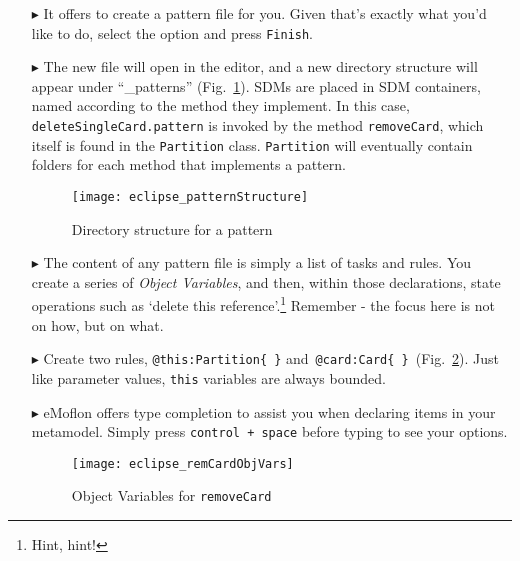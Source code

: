 \begin{itemize}
\item[$\blacktriangleright$] It offers to create a pattern file for you. Given that's exactly what you'd like to do, select the option and press
\texttt{Finish}.

\item[$\blacktriangleright$] The new file will open in the editor, and a new directory structure will appear under ``\_patterns'' (Fig.~\ref{fig:pattStruct}). SDMs are
placed in SDM containers, named according to the method they implement. In this case, \texttt{deleteSingleCard.pattern} is invoked by the method \texttt{removeCard},
which itself is found in the \texttt{Partition} class. \texttt{Partition} will eventually contain folders for each method that implements a pattern.

\begin{figure}[htp]
\begin{center}
  \texttt{[image: eclipse\_patternStructure]}
  \caption{Directory structure for a pattern}
  \label{fig:pattStruct}
\end{center}
\end{figure}

\item[$\blacktriangleright$] The content of any pattern file is simply a list of tasks and rules. You create a series of \emph{Object Variables}, and then,
within those declarations, state operations such as `delete this reference'.\footnote{Hint, hint!} Remember - the focus here is not on how, but on what.

\item[$\blacktriangleright$] Create two rules, \texttt{@this:Partition\{ \}} and~\texttt{@card:Card\{ \}}~(Fig.~\ref{fig:remCardObjVar}). Just like parameter
values, \texttt{this} variables are always bounded.

\item[$\blacktriangleright$] eMoflon offers type completion to assist you when declaring items in your metamodel. Simply press \texttt{control + space} before
typing to see your options.

\begin{figure}[htp]
\begin{center}
  \texttt{[image: eclipse\_remCardObjVars]}
  \caption{Object Variables for \texttt{removeCard}}
  \label{fig:remCardObjVar}
\end{center}
\end{figure}

\clearpage


\end{itemize}
